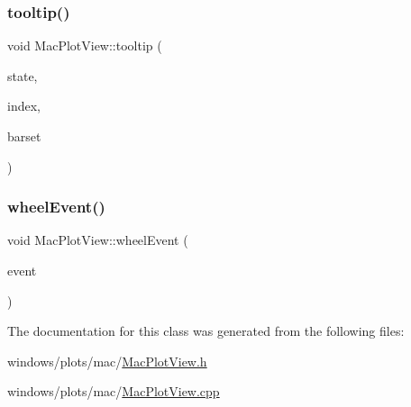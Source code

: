 \subsubsection{\texorpdfstring{tooltip()}{tooltip()}}
{\footnotesize\ttfamily void Mac\+Plot\+View\+::tooltip (\begin{DoxyParamCaption}\item[{bool}]{state,  }\item[{int}]{index,  }\item[{Q\+Bar\+Set $\ast$}]{barset }\end{DoxyParamCaption})}

\mbox{\label{class_mac_plot_view_a743b5945dc70501d16366099968e14ca}} 
\subsubsection{\texorpdfstring{wheel\+Event()}{wheelEvent()}}
{\footnotesize\ttfamily void Mac\+Plot\+View\+::wheel\+Event (\begin{DoxyParamCaption}\item[{Q\+Wheel\+Event $\ast$}]{event }\end{DoxyParamCaption})}



The documentation for this class was generated from the following files\+:\begin{DoxyCompactItemize}
\item 
windows/plots/mac/\hyperlink{_mac_plot_view_8h}{Mac\+Plot\+View.\+h}\item 
windows/plots/mac/\hyperlink{_mac_plot_view_8cpp}{Mac\+Plot\+View.\+cpp}\end{DoxyCompactItemize}
